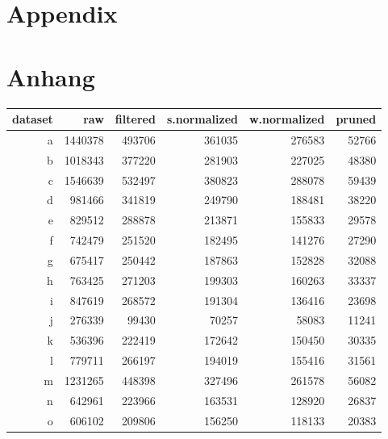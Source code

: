 {\chapter{Appendix}}    %
{\chapter{Anhang}}      %
\label{chap:appendix}

\begin{table}[h]
    \centering
    \begin{tabularx}{\textwidth}{r R R R R R}
        \toprule
        dataset & raw & filtered & s.normalized & w.normalized & pruned\\
        \midrule
        a & \num{1440378} & \num{493706} & \num{361035} & \num{276583} & \num{52766}\\
        b & \num{1018343} & \num{377220} & \num{281903} & \num{227025} & \num{48380}\\
        c & \num{1546639} & \num{532497} & \num{380823} & \num{288078} & \num{59439}\\
        d & \num{981466} & \num{341819} & \num{249790} & \num{188481} & \num{38220}\\
        e & \num{829512} & \num{288878} & \num{213871} & \num{155833} & \num{29578}\\
        f & \num{742479} & \num{251520} & \num{182495} & \num{141276} & \num{27290}\\
        g & \num{675417} & \num{250442} & \num{187863} & \num{152828} & \num{32088}\\
        h & \num{763425} & \num{271203} & \num{199303} & \num{160263} & \num{33337}\\
        i & \num{847619} & \num{268572} & \num{191304} & \num{136416} & \num{23698}\\
        j & \num{276339} & \num{99430} & \num{70257} & \num{58083} & \num{11241}\\
        k & \num{536396} & \num{222419} & \num{172642} & \num{150450} & \num{30335}\\
        l & \num{779711} & \num{266197} & \num{194019} & \num{155416} & \num{31561}\\
        m & \num{1231265} & \num{448398} & \num{327496} & \num{261578} & \num{56082}\\
        n & \num{642961} & \num{223966} & \num{163531} & \num{128920} & \num{26837}\\
        o & \num{606102} & \num{209806} & \num{156250} & \num{118133} & \num{20383}\\

\end{tabularx}
\end{table}
